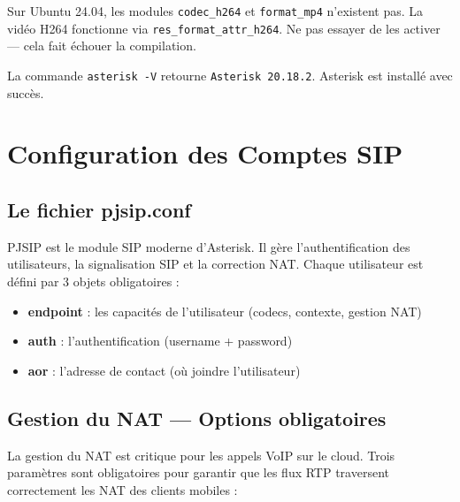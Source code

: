 \documentclass[a4paper,11pt]{report}
\begin{document}
\begin{dangerbox}
Sur Ubuntu 24.04, les modules \texttt{codec\_h264} et \texttt{format\_mp4} n'existent pas. La vidéo H264 fonctionne via \texttt{res\_format\_attr\_h264}. Ne pas essayer de les activer — cela fait échouer la compilation.
\end{dangerbox}

\begin{successbox}
La commande \texttt{asterisk -V} retourne \texttt{Asterisk 20.18.2}. Asterisk est installé avec succès.
\end{successbox}

\chapter{Configuration des Comptes SIP}

\section{Le fichier pjsip.conf}

\begin{infobox}
PJSIP est le module SIP moderne d'Asterisk. Il gère l'authentification des utilisateurs, la signalisation SIP et la correction NAT. Chaque utilisateur est défini par 3 objets obligatoires :
\begin{itemize}[leftmargin=1.2em, itemsep=2pt]
  \item \textbf{endpoint} : les capacités de l'utilisateur (codecs, contexte, gestion NAT)
  \item \textbf{auth} : l'authentification (username + password)
  \item \textbf{aor} : l'adresse de contact (où joindre l'utilisateur)
\end{itemize}
\end{infobox}

\section{Gestion du NAT — Options obligatoires}

La gestion du NAT est critique pour les appels VoIP sur le cloud. Trois paramètres sont obligatoires pour garantir que les flux RTP traversent correctement les NAT des clients mobiles :
\end{document}
